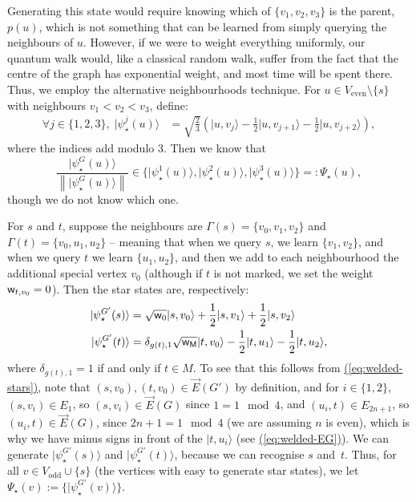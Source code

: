 \documentclass{theoretics}
\newcommand{\eq}[1]{\hyperref[eq:#1]{(\ref*{eq:#1})}}
\def\ket#1{{\lvert}#1\rangle}
\renewcommand{\>}{\rangle}
\newcommand{\<}{\langle}
\renewcommand{\(}{\left(}
\renewcommand{\)}{\right)}
\def\norm#1{\left\| #1 \right\|}
\def\w{{\sf w}}
\begin{document}
Generating this state would require knowing which of $\{v_1,v_2,v_3\}$ is the parent, $p(u)$, which is not something that can be learned from simply querying the neighbours of $u$. However, if we were to weight everything uniformly, our quantum walk would, like a classical random walk, suffer from the fact that the centre of the graph has exponential weight, and most time will be spent there. Thus, we employ the alternative neighbourhoods technique. 
For $u\in V_{\mathrm{even}}\setminus\{s\}$ with neighbours $v_1<v_2<v_3$, define:
\begin{equation}
\begin{split}
\forall j\in\{1,2,3\},\; \ket{\psi_\star^j(u)} &= \sqrt{\frac{2}{3}}\left(\ket{u,v_j}-\frac{1}{2}\ket{u,v_{j+1}}-\frac{1}{2}\ket{u,v_{j+2}}\right),
\end{split}\label{eq:welded-alt-neighbourhood}
\end{equation}
where the indices add modulo 3. Then we know that 
$$\frac{\ket{\psi_\star^G(u)}}{\norm{\ket{\psi_\star^G(u)}}}\in \{\ket{\psi_\star^1(u)},\ket{\psi_\star^2(u)},\ket{\psi_\star^3(u)}\}=:\Psi_\star(u),$$
though we do not know which one. 

For $s$ and $t$, suppose the neighbours are $\Gamma(s)=\{v_0,v_1,v_2\}$ and $\Gamma(t)=\{v_0,u_1,u_2\}$ -- meaning that when we query $s$, we learn $\{v_1,v_2\}$, and when we query $t$ we learn $\{u_1,u_2\}$, and then we add to each neighbourhood the additional special vertex $v_0$ (although if $t$ is not marked, we set the weight $\w_{t,v_0}=0$). 
Then the star states are, respectively:
\begin{equation}
\begin{split}
\ket{\psi_\star^{G'}(s)} &= \sqrt{\w_0}\ket{s,v_0}+\frac{1}{2}\ket{s,v_1}+\frac{1}{2}\ket{s,v_2}\\
\ket{\psi_\star^{G'}(t)} &= \delta_{g(t),1}\sqrt{\w_{\sf M}}\ket{t,v_0}-\frac{1}{2}\ket{t,u_1}-\frac{1}{2}\ket{t,u_2},
\end{split}\label{eq:welded-st-stars}
\end{equation}
where $\delta_{g(t),1}=1$ if and only if $t\in M$. To see that this follows from \eq{welded-stars}, note that $(s,v_0),(t,v_0)\in \overrightarrow{E}(G')$ by definition, and for $i\in\{1,2\}$, $(s,v_i)\in E_1$, so $(s,v_i)\in \overrightarrow{E}(G)$ since $1=1\mod 4$, and $(u_i,t)\in E_{2n+1}$, so $(u_i,t)\in\overrightarrow{E}(G)$, since $2n+1=1\mod 4$ (we are assuming $n$ is even), which is why we have minus signs in front of the $\ket{t,u_i}$
(see \eq{welded-EG}).
We can generate $\ket{\psi_\star^{G'}(s)}$ and $\ket{\psi_\star^{G'}(t)}$, because we can recognise $s$ and~$t$. Thus, for all $v\in  V_{\mathrm{odd}}\cup\{s\}$ (the vertices with easy to generate star states), we let $\Psi_\star(v):=\{\ket{\psi_\star^{G'}(v)}\}$. 
\end{document}
